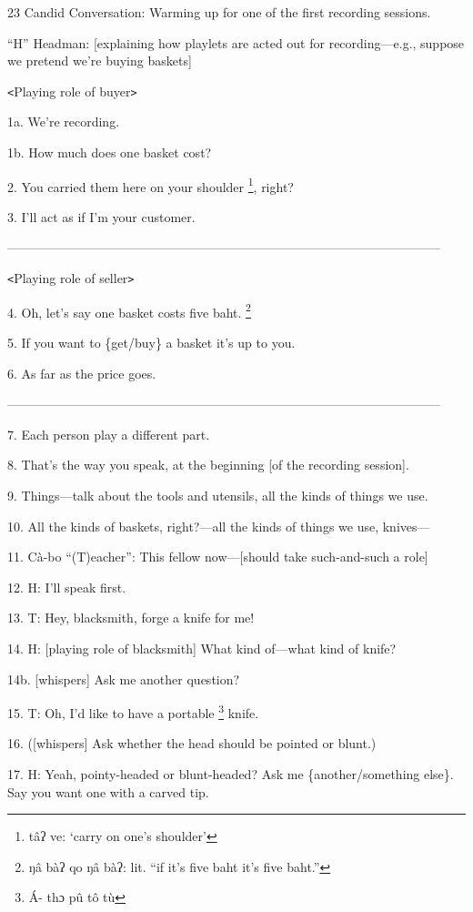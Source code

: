 
23 Candid Conversation: Warming up for one of the first recording sessions.

``H'' Headman: [explaining how playlets are acted out for recording---e.g., suppose
we pretend we're buying baskets]

\texttt{<}Playing role of buyer\texttt{>}

1a. We're recording.

1b. How much does one basket cost?

2. You carried them here on your shoulder \footnote{tâʔ ve: `carry on one's shoulder'}, right?

3. I'll act as if I'm your customer.

------------------------------------------------------------------------------------------------------

\texttt{<}Playing role of seller\texttt{>}

4. Oh, let's say one basket costs five baht. \footnote{ŋâ bàʔ qo ŋâ bàʔ: lit. ``if it's five baht it's five baht.''}

5. If you want to \{get/buy\} a basket it's up to you.

6. As far as the price goes.

------------------------------------------------------------------------------------------------------

7. Each person play a different part.

8. That's the way you speak, at the beginning [of the recording session].

9. Things---talk about the tools and utensils, all the kinds of things we use.

10. All the kinds of baskets, right?---all the kinds of things we use, knives---

11. Cà-bo ``(T)eacher'': This fellow now---[should take such-and-such a role]

12. H: I'll speak first.

13. T: Hey, blacksmith, forge a knife for me!

14. H: [playing role of blacksmith] What kind of---what kind of knife?

14b. [whispers] Ask me another question?

15. T: Oh, I'd like to have a portable \footnote{Á- thɔ pû tô  tù} knife.

16.  ([whispers] Ask whether the head should be pointed or blunt.)

17. H: Yeah, pointy-headed or blunt-headed?  Ask me \{another/something else\}.
Say you want one with a carved tip.

